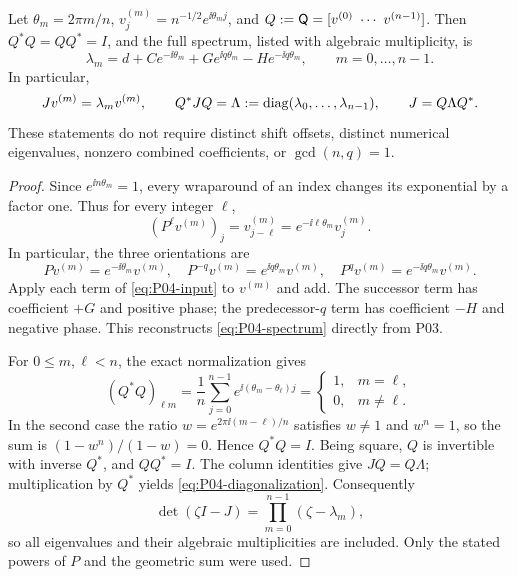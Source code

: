 \begin{theorem}
\label{thm:P04-spectrum}
Let $\theta_m=2\pi m/n$, $v^{(m)}_j=n^{-1/2}e^{\ii\theta_m j}$,
and $Q:=\Fourier=[v^{(0)}\ \cdots\ v^{(n-1)}]$.
Then $Q^*Q=QQ^*=I$, and the full spectrum, listed with algebraic
multiplicity, is
\begin{equation}
 \boxed{\lambda_m=d+Ce^{-\ii\theta_m}
                      +Ge^{\ii q\theta_m}-He^{-\ii q\theta_m},
           \qquad m=0,\ldots,n-1.}
 \label{eq:P04-spectrum}
\end{equation}
In particular,
\begin{equation}
 Jv^{(m)}=\lambda_m v^{(m)},\qquad
 Q^*JQ=\Lambda:=\operatorname{diag}(\lambda_0,\ldots,\lambda_{n-1}),\qquad
 J=Q\Lambda Q^*.
 \label{eq:P04-diagonalization}
\end{equation}
These statements do not require distinct shift offsets, distinct
numerical eigenvalues, nonzero combined coefficients, or
$\gcd(n,q)=1$.
\end{theorem}
\begin{proof}
Since $e^{\ii n\theta_m}=1$, every wraparound of an index changes
its exponential by a factor one. Thus for every integer $\ell$,
\[
 (P^\ell v^{(m)})_j=v^{(m)}_{j-\ell}
       =e^{-\ii\ell\theta_m}v^{(m)}_j.
\]
In particular, the three orientations are
\begin{equation}
 Pv^{(m)}=e^{-\ii\theta_m}v^{(m)},\quad
 P^{-q}v^{(m)}=e^{\ii q\theta_m}v^{(m)},\quad
 P^qv^{(m)}=e^{-\ii q\theta_m}v^{(m)}.
 \label{eq:P04-shifts}
\end{equation}
Apply each term of \eqref{eq:P04-input} to $v^{(m)}$ and add.
The successor term has coefficient $+G$ and positive phase;
the predecessor-$q$ term has coefficient $-H$ and negative phase.
This reconstructs \eqref{eq:P04-spectrum} directly from P03.

For $0\le m,\ell<n$, the exact normalization gives
\[
 (Q^*Q)_{\ell m}=\frac1n\sum_{j=0}^{n-1}
             e^{\ii(\theta_m-\theta_\ell)j}
   =\begin{cases}1,&m=\ell,\\0,&m\ne\ell.\end{cases}
\]
In the second case the ratio $w=e^{2\pi\ii(m-\ell)/n}$ satisfies
$w\ne1$ and $w^n=1$, so the sum is $(1-w^n)/(1-w)=0$.
Hence $Q^*Q=I$. Being square, $Q$ is invertible with inverse $Q^*$,
and $QQ^*=I$. The column identities give $JQ=Q\Lambda$;
multiplication by $Q^*$ yields \eqref{eq:P04-diagonalization}.
Consequently
\begin{equation}
 \det(\zeta I-J)=\prod_{m=0}^{n-1}(\zeta-\lambda_m),
 \label{eq:P04-characteristic}
\end{equation}
so all eigenvalues and their algebraic multiplicities are included.
Only the stated powers of $P$ and the geometric sum were used.
\end{proof}

